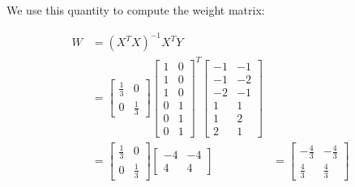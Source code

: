{We use this quantity to compute the weight matrix:

\begin{align}
    W & = (X^TX)^{-1}X^TY \\
      & = \begin{bmatrix} \frac{1}{3} & 0 \\ 0 & \frac{1}{3} \end{bmatrix}
          \begin{bmatrix} 1 & 0 \\ 1 & 0 \\ 1 & 0 \\
                          0 & 1 \\ 0 & 1 \\ 0 & 1 \end{bmatrix}^T
          \begin{bmatrix} -1 & -1 \\ -1 & -2 \\ -2 & -1 \\
                           1 &  1 \\  1 &  2 \\  2 &  1 \end{bmatrix} \\
      & = \begin{bmatrix} \frac{1}{3} & 0 \\ 0 & \frac{1}{3} \end{bmatrix}
          \begin{bmatrix} -4 & -4 \\ 4 & 4 \end{bmatrix}
      & = \begin{bmatrix} -\frac{4}{3} & -\frac{4}{3} \\
                           \frac{4}{3} &  \frac{4}{3} \end{bmatrix}
\end{align}

}

